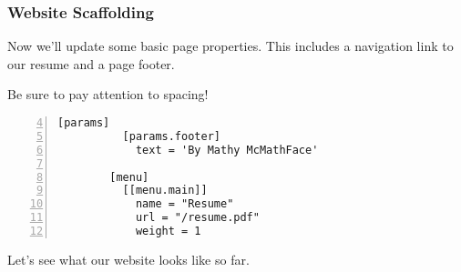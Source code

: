 \begin{frame}[fragile]
    \frametitle{Website Scaffolding}

    Now we'll update some basic page properties. This includes a navigation link to our resume and a page footer.

    \bigskip
    
    Be sure to pay attention to spacing!

    \medskip

    \begin{lstlisting}[style=saneCode,gobble=8,title={config.toml [ctd.]},numbers=left,firstnumber=4]
        [params]
          [params.footer]
            text = 'By Mathy McMathFace'
        
        [menu]
          [[menu.main]]
            name = "Resume"
            url = "/resume.pdf"
            weight = 1
    \end{lstlisting}

    \vfill

    Let's see what our website looks like so far.
\end{frame}